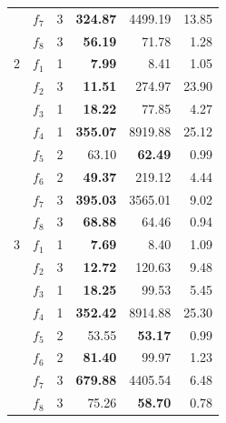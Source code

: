 \documentclass[12pt]{article}
\begin{document}
\begin{table}[H]
\begin{tabular}{llrrrr}
                & $f_7$ &       3 &   \textbf{324.87} &      4499.19 &             13.85 \\
                & $f_8$ &       3 &    \textbf{56.19} &        71.78 &              1.28 \\
                \midrule
                2 & $f_1$ &       1 &   \textbf{7.99} &         8.41 &              1.05 \\
                & $f_2$ &       3 &    \textbf{11.51} &       274.97 &             23.90 \\
                & $f_3$ &       1 &    \textbf{18.22} &        77.85 &              4.27 \\
                & $f_4$ &       1 &   \textbf{355.07} &      8919.88 &             25.12 \\
                & $f_5$ &       2 &    63.10 &        \textbf{62.49} &              0.99 \\
                & $f_6$ &       2 &    \textbf{49.37} &       219.12 &              4.44 \\
                & $f_7$ &       3 &   \textbf{395.03} &      3565.01 &              9.02 \\
                & $f_8$ &       3 &    \textbf{68.88} &        64.46 &              0.94 \\
                \midrule
                3 & $f_1$ &       1 &    \textbf{7.69} &         8.40 &              1.09 \\
                & $f_2$ &       3 &   \textbf{12.72} &       120.63 &              9.48 \\
                & $f_3$ &       1 &   \textbf{18.25} &        99.53 &              5.45 \\
                & $f_4$ &       1 &  \textbf{352.42} &      8914.88 &             25.30 \\
                & $f_5$ &       2 &   53.55 &        \textbf{53.17} &              0.99 \\
                & $f_6$ &       2 &   \textbf{81.40} &        99.97 &              1.23 \\
                & $f_7$ &       3 &  \textbf{679.88} &      4405.54 &              6.48 \\
                & $f_8$ &       3 &   75.26 &        \textbf{58.70} &              0.78 \\
                \bottomrule
            \end{tabular}
        \end{table}
\end{document}
